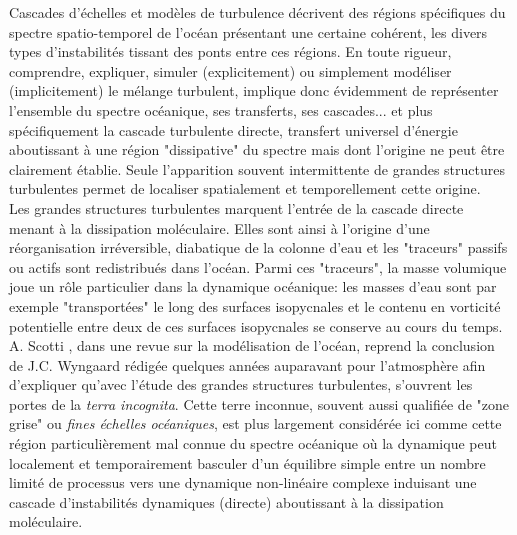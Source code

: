 Cascades d'échelles et modèles de turbulence décrivent des régions spécifiques du spectre spatio-temporel de l'océan présentant une certaine cohérent, les divers types d'instabilités tissant des ponts entre ces régions. En toute rigueur, comprendre, expliquer, simuler (explicitement) ou simplement modéliser (implicitement) le mélange turbulent, implique donc évidemment de représenter l'ensemble du spectre océanique, ses transferts, ses cascades... et plus spécifiquement la cascade turbulente directe, transfert universel d'énergie aboutissant à une région "dissipative" du spectre mais dont l'origine ne peut être clairement établie. Seule l'apparition souvent intermittente de grandes structures turbulentes permet de localiser spatialement et temporellement cette origine.\\
Les grandes structures turbulentes marquent l'entrée de la cascade directe menant à la dissipation moléculaire. Elles sont ainsi à l'origine d'une réorganisation irréversible, diabatique de la colonne d'eau et les "traceurs" passifs ou actifs sont redistribués dans l'océan. Parmi ces "traceurs", la masse volumique joue un rôle particulier dans la dynamique océanique: les masses d'eau sont par exemple "transportées" le long des surfaces isopycnales et le contenu en vorticité potentielle entre deux de ces surfaces isopycnales se conserve au cours du temps.\\
A. Scotti \cite{scotti_large_2010}, dans une revue sur la modélisation de l'océan, reprend la conclusion de J.C. Wyngaard \cite{wyngaard_toward_2004} rédigée quelques années auparavant pour l'atmosphère afin d'expliquer qu’avec l'étude des grandes structures turbulentes, s'ouvrent les portes de la \textit{terra incognita}. Cette terre inconnue, souvent aussi qualifiée de "zone grise" ou \textit{fines échelles océaniques}, est plus largement considérée ici comme cette région particulièrement mal connue du spectre océanique où la dynamique peut localement et temporairement basculer d'un équilibre simple entre un nombre limité de processus vers une dynamique non-linéaire complexe induisant une cascade d'instabilités dynamiques (directe) aboutissant à la dissipation moléculaire. 

\color{black}


